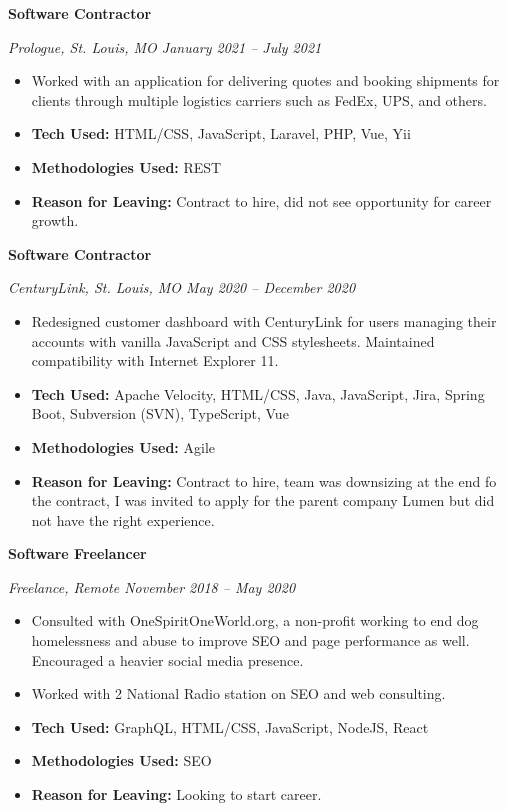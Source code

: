 \documentclass[a4ppaper, 10pt]{article}
\newcommand{\subheading}[1]{\vspace{2pt}\noindent\textbf{#1}\par}
\begin{document}
	\pagebreak
	
	\subheading{Software Contractor}
	\raggedright
	\textit{Prologue, St. Louis, MO \hfill January 2021 -- July 2021}
	\begin{itemize}[itemsep=0pt, topsep=2pt]
		\item Worked with an application for delivering quotes and booking shipments for clients through multiple logistics carriers such as FedEx, UPS, and others.
		\item \textbf{Tech Used:}  HTML/CSS, JavaScript, Laravel, PHP, Vue, Yii
		\item \textbf{Methodologies Used:} REST
		\item \textbf{Reason for Leaving:} Contract to hire, did not see opportunity for career growth.
	\end{itemize}
	
	\subheading{Software Contractor}
	\raggedright
	\textit{CenturyLink, St. Louis, MO \hfill May 2020 -- December 2020}
	\begin{itemize}[itemsep=0pt, topsep=2pt]
		\item Redesigned customer dashboard with CenturyLink for users managing their accounts with vanilla JavaScript and CSS stylesheets. Maintained compatibility with Internet Explorer 11.
		\item \textbf{Tech Used:}  Apache Velocity, HTML/CSS, Java, JavaScript, Jira, Spring Boot, Subversion (SVN), TypeScript, Vue
		\item \textbf{Methodologies Used:} Agile
		\item \textbf{Reason for Leaving:} Contract to hire, team was downsizing at the end fo the contract, I was invited to apply for the parent company Lumen but did not have the right experience.
	\end{itemize}
	
	\subheading{Software Freelancer}
	\raggedright
	\textit{Freelance, Remote \hfill November 2018 -- May 2020}
	\begin{itemize}[itemsep=0pt, topsep=2pt]
		\item Consulted with OneSpiritOneWorld.org, a non-profit working to end dog homelessness and abuse to improve SEO and page performance as well. Encouraged a heavier social media presence.
		\item Worked with 2 National Radio station on SEO and web consulting.
		\item \textbf{Tech Used:}  GraphQL, HTML/CSS, JavaScript, NodeJS, React
		\item \textbf{Methodologies Used:} SEO
		\item \textbf{Reason for Leaving:} Looking to start career.
	\end{itemize}
\end{document}
